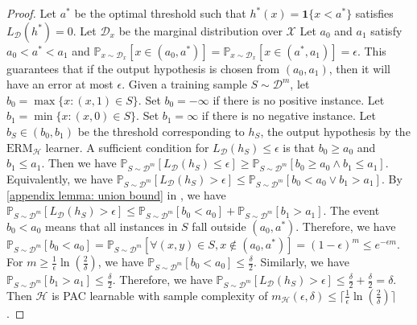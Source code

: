 \documentclass[openany, amssymb, psamsfonts]{amsart}
\theoremstyle{definition}
\numberwithin{equation}{section}
\begin{document}
\begin{proof}
  Let $a^*$ be the optimal threshold such that $h^*(x) = \mathbf{1}\{x < a^*\}$ satisfies $L_{\mathcal{D}}(h^*) = 0$. Let $\mathcal{D}_x$ be the marginal distribution over $\mathcal{X}$ Let $a_0$ and $a_1$ satisfy $a_0 < a^* < a_1$ and $\mathbb{P}_{x \sim \mathcal{D}_x}[x \in (a_0, a^*)] = \mathbb{P}_{x \sim \mathcal{D}_x}[x \in (a^*, a_1)] = \epsilon$.
This guarantees that if the output hypothesis is chosen from $(a_0,a_1)$, then it will have an error at most $\epsilon$.
Given a training sample $S \sim \mathcal{D}^m$, let
$ b_0 = \max\{x \colon (x,1) \in S\}$. Set $b_0 = -\infty$ if there is no positive instance.
Let $ b_1 = \min\{x \colon (x,0) \in S\}$. Set $b_1 = \infty$ if there is no negative instance.
Let $b_S \in (b_0, b_1)$ be the threshold corresponding to $h_S$, the output hypothesis by the $\mathrm{ERM}_{\mathcal{H}}$ learner. A sufficient condition for $L_{\mathcal{D}}(h_S) \leq \epsilon$ is that $b_0 \geq a_0$ and $b_1 \leq a_1$. 
Then we have $\mathbb{P}_{S \sim \mathcal{D}^m}[L_{\mathcal{D}}(h_S) \leq \epsilon] \geq \mathbb{P}_{S \sim \mathcal{D}^m}[b_0 \geq a_0 \land b_1 \leq a_1]$.
Equivalently, we have $\mathbb{P}_{S \sim \mathcal{D}^m}[L_{\mathcal{D}}(h_S) > \epsilon] \leq \mathbb{P}_{S \sim \mathcal{D}^m}[b_0 < a_0 \lor b_1 > a_1]$.
By \autoref{appendix lemma: union bound} in , we have $\mathbb{P}_{S \sim \mathcal{D}^m}[L_{\mathcal{D}}(h_S) > \epsilon] \leq \mathbb{P}_{S \sim \mathcal{D}^m}[b_0 < a_0] + \mathbb{P}_{S \sim \mathcal{D}^m}[b_1 > a_1]$.
The event $b_0 < a_0$ means that all instances in $S$ fall outside $(a_0, a^*)$. Therefore, we have $\mathbb{P}_{S \sim \mathcal{D}^m}[b_0 < a_0] = \mathbb{P}_{S \sim \mathcal{D}^m}[\forall (x,y) \in S, x \notin (a_0, a^*)] = (1 - \epsilon)^m \leq e^{-\epsilon m}$.
For $m \geq \frac{1}{\epsilon}\ln\left(\frac{2}{\delta}\right)$, we have $\mathbb{P}_{S \sim \mathcal{D}^m}[b_0 < a_0] \leq \frac{\delta}{2}$. Similarly, we have $\mathbb{P}_{S \sim \mathcal{D}^m}[b_1 > a_1] \leq \frac{\delta}{2}$. Therefore, we have $\mathbb{P}_{S \sim \mathcal{D}^m}[L_{\mathcal{D}}(h_S) > \epsilon] \leq \frac{\delta}{2} + \frac{\delta}{2} = \delta$. Then $\mathcal{H}$ is PAC learnable with sample complexity of $m_{\mathcal{H}}(\epsilon,\delta) \leq \lceil \frac{1}{\epsilon}\ln\left(\frac{2}{\delta}\right) \rceil$.
\end{proof}
\end{document}
